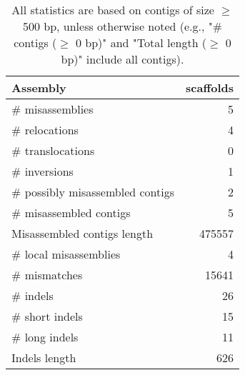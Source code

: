 \documentclass[12pt,a4paper]{article}
\begin{document}
\begin{table}[ht]
\begin{center}
\caption{All statistics are based on contigs of size $\geq$ 500 bp, unless otherwise noted (e.g., "\# contigs ($\geq$ 0 bp)" and "Total length ($\geq$ 0 bp)" include all contigs).}
\begin{tabular}{|l*{1}{|r}|}
\hline
Assembly & scaffolds \\ \hline
\# misassemblies & 5 \\ \hline
\hspace{5mm}\# relocations & 4 \\ \hline
\hspace{5mm}\# translocations & 0 \\ \hline
\hspace{5mm}\# inversions & 1 \\ \hline
\# possibly misassembled contigs & 2 \\ \hline
\# misassembled contigs & 5 \\ \hline
Misassembled contigs length & 475557 \\ \hline
\# local misassemblies & 4 \\ \hline
\# mismatches & 15641 \\ \hline
\# indels & 26 \\ \hline
\hspace{5mm}\# short indels & 15 \\ \hline
\hspace{5mm}\# long indels & 11 \\ \hline
Indels length & 626 \\ \hline
\end{tabular}
\end{center}
\end{table}
\end{document}
